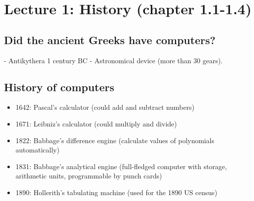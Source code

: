 \section{Lecture 1: History (chapter 1.1-1.4)}

\subsection{Did the ancient Greeks have computers?}
- Antikythera 1 century BC - Astronomical device (more than 30 gears).
\subsection{History of computers}
\begin{itemize}
    \item 1642: Pascal's calculator (could add and subtract numbers)
    \item 1671: Leibniz's calculator (could multiply and divide)
    \item 1822: Babbage's difference engine (calculate values of polynomials automatically)
    \item 1831: Babbage's analytical engine (full-fledged computer with storage, arithmetic units, programmable by punch cards)
    \item 1890: Hollerith's tabulating machine (used for the 1890 US census)
\end{itemize}
